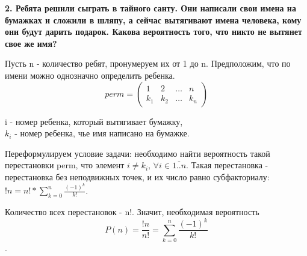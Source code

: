 \documentclass{article}
\begin{document}
\noindent \textbf{2. Ребята решили сыграть в тайного санту. Они написали свои имена на бумажках и сложили в шляпу, а сейчас вытягивают имена человека, кому они будут дарить подарок. Какова вероятность того, что никто не вытянет свое же имя?}

Пусть n - количество ребят, пронумеруем их от 1 до n. Предположим, что по имени можно однозначно определить ребенка.
\[
  perm = 
  \begin{pmatrix}
    1 & 2 &  \ldots & n \\  
    k_1 & k_2 & \ldots & k_n  
  \end{pmatrix}
\]

\begin{center}
i - номер ребенка, который вытягивает бумажку,\\
$k_i$ - номер ребенка, чье имя написано на бумажке.
\end{center}

Переформулируем условие задачи: необходимо найти вероятность такой перестановки perm, что элемент $i \neq k_i \text{, } \forall i \in \overline{1..n}$. Такая перестановка -  перестановка без неподвижных точек, и их число равно субфакториалу: $!n = n!*\sum_{k=0}^n\frac{(-1)^k}{k!}$.

Количество всех перестановок - n!. Значит, необходимая вероятность \[P(n) = \frac{!n}{n!} = \sum_{k=0}^n\frac{(-1)^k}{k!}\].
\end{document}
